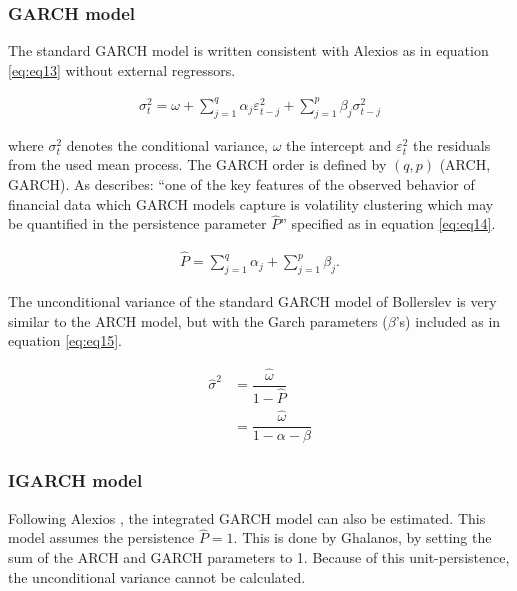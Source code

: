 \documentclass[a4paper, twoside]{templates/ociamthesis}
\begin{document}
\hypertarget{garch-model}{%
\subsubsection{GARCH model}\label{garch-model}}

The standard GARCH model \autocite{bollerslev1986} is written consistent with Alexios \textcite{ghalanos2020} as in equation \eqref{eq:eq13} without external regressors.

\begin{align}
\sigma_t^2 = \omega  + \sum\limits_{j = 1}^q {{\alpha_j}\varepsilon _{t-j}^2 +} \sum\limits_{j=1}^p {{\beta_j}\sigma_{t-j}^2} 
 \label{eq:eq13}
\end{align}

where \(\sigma_t^2\) denotes the conditional variance, \(\omega\) the intercept and \(\varepsilon_t^2\) the residuals from the used mean process. The GARCH order is defined by \((q, p)\) (ARCH, GARCH). As \textcite{ghalanos2020} describes: ``one of the key features of the observed behavior of financial data which GARCH models capture is volatility clustering which may be quantified in the persistence parameter \(\hat{P}\)'' specified as in equation \eqref{eq:eq14}.

\begin{align}
\hat{P} = \sum\limits_{j = 1}^q {{\alpha_j}}  + \sum\limits_{j = 1}^p {{\beta_j}}.
 \label{eq:eq14}
\end{align}

The unconditional variance of the standard GARCH model of Bollerslev is very similar to the ARCH model, but with the Garch parameters (\(\beta\)'s) included as in equation \eqref{eq:eq15}.

\begin{equation}
\begin{split}
\hat{\sigma}^2 
&= \dfrac{\hat{\omega}}{1 - \hat{P}} \\
&= \dfrac{\hat{\omega}}{1 - \alpha - \beta}
\end{split}
 \label{eq:eq15}
\end{equation}

\hypertarget{igarch-model}{%
\subsubsection{IGARCH model}\label{igarch-model}}

Following Alexios \textcite{ghalanos2020}, the integrated GARCH model \autocite{bollerslev1986} can also be estimated. This model assumes the persistence \(\hat{P} = 1\). This is done by Ghalanos, by setting the sum of the ARCH and GARCH parameters to 1. Because of this unit-persistence, the unconditional variance cannot be calculated.
\end{document}
